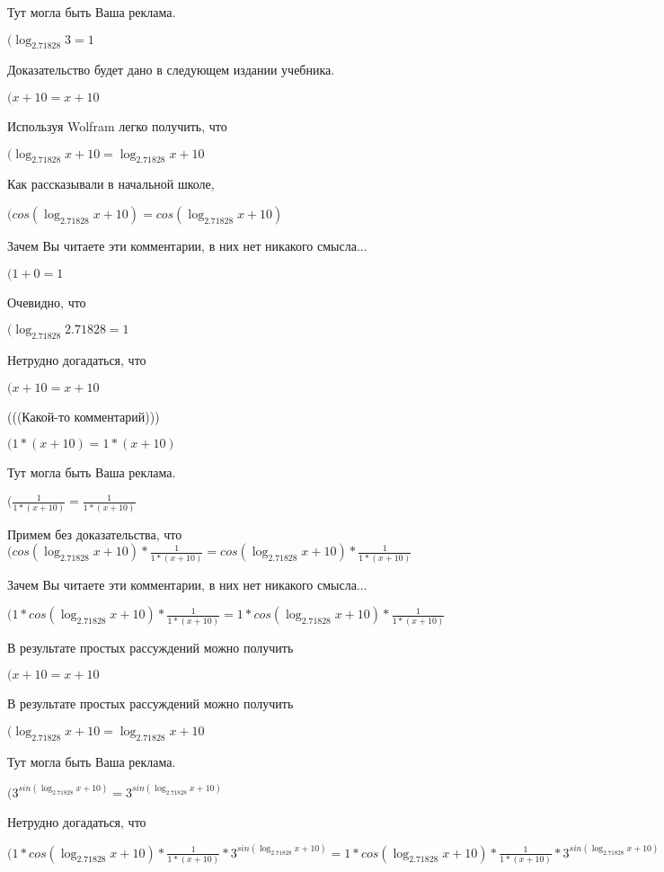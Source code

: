 \documentclass[12pt,a4paper,fleqn]{article}
\theoremstyle{definition}
\begin{document}
Тут могла быть Ваша реклама.

$(\log_{ 2.71828 }{ 3 } =  1 $

Доказательство будет дано в следующем издании учебника.

$( x  +  10  =  x  +  10 $

Используя Wolfram легко получить, что

$(\log_{ 2.71828 }{ x  +  10 } = \log_{ 2.71828 }{ x  +  10 }$

Как рассказывали в начальной школе,

$(cos(\log_{ 2.71828 }{ x  +  10 }) = cos(\log_{ 2.71828 }{ x  +  10 })$

Зачем Вы читаете эти комментарии, в них нет никакого смысла...

$( 1  +  0  =  1 $

Очевидно, что

$(\log_{ 2.71828 }{ 2.71828 } =  1 $

Нетрудно догадаться, что

$( x  +  10  =  x  +  10 $

(((Какой-то комментарий)))

$( 1  * ( x  +  10 ) =  1  * ( x  +  10 )$

Тут могла быть Ваша реклама.

$(\frac{ 1 }{ 1  * ( x  +  10 )}
 = \frac{ 1 }{ 1  * ( x  +  10 )}
$

Примем без доказательства, что
$(cos(\log_{ 2.71828 }{ x  +  10 }) * \frac{ 1 }{ 1  * ( x  +  10 )}
 = cos(\log_{ 2.71828 }{ x  +  10 }) * \frac{ 1 }{ 1  * ( x  +  10 )}
$

Зачем Вы читаете эти комментарии, в них нет никакого смысла...

$( 1  * cos(\log_{ 2.71828 }{ x  +  10 }) * \frac{ 1 }{ 1  * ( x  +  10 )}
 =  1  * cos(\log_{ 2.71828 }{ x  +  10 }) * \frac{ 1 }{ 1  * ( x  +  10 )}
$

В результате простых рассуждений можно получить

$( x  +  10  =  x  +  10 $

В результате простых рассуждений можно получить

$(\log_{ 2.71828 }{ x  +  10 } = \log_{ 2.71828 }{ x  +  10 }$

Тут могла быть Ваша реклама.

$({ 3 }^{sin(\log_{ 2.71828 }{ x  +  10 })} = { 3 }^{sin(\log_{ 2.71828 }{ x  +  10 })}$

Нетрудно догадаться, что

$( 1  * cos(\log_{ 2.71828 }{ x  +  10 }) * \frac{ 1 }{ 1  * ( x  +  10 )}
 * { 3 }^{sin(\log_{ 2.71828 }{ x  +  10 })} =  1  * cos(\log_{ 2.71828 }{ x  +  10 }) * \frac{ 1 }{ 1  * ( x  +  10 )}
 * { 3 }^{sin(\log_{ 2.71828 }{ x  +  10 })}$
\end{document}
